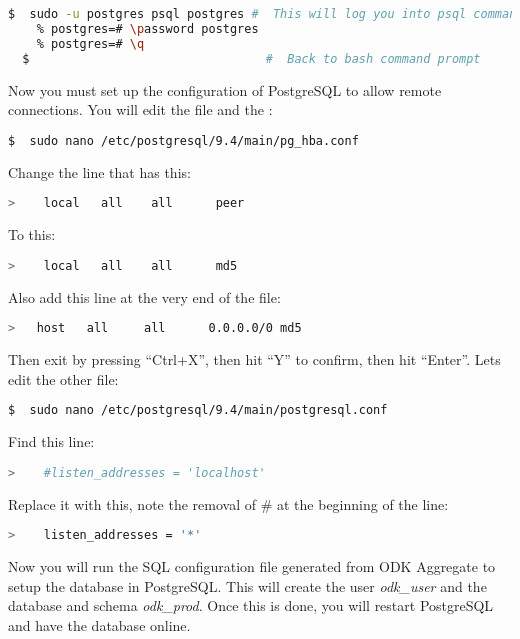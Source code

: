 \begin{lstlisting}[language=bash]
  $  sudo -u postgres psql postgres #  This will log you into psql command prompt.
    % postgres=# \password postgres
    % postgres=# \q
  $                                 #  Back to bash command prompt
\end{lstlisting}

\noindent
Now you must set up the configuration of PostgreSQL to allow remote connections. You will edit the  file and the :

\begin{lstlisting}[language=bash]
  $  sudo nano /etc/postgresql/9.4/main/pg_hba.conf
\end{lstlisting}

\noindent
Change the line that has this:
\begin{lstlisting}[language=bash]
  >    local   all    all      peer
\end{lstlisting}
\noindent
To this:
\begin{lstlisting}[language=bash]
  >    local   all    all      md5
\end{lstlisting}

\noindent
Also add this line at the very end of the file:
\begin{lstlisting}[language=bash]
  >   host   all     all      0.0.0.0/0 md5
\end{lstlisting}

\noindent
Then exit by pressing ``Ctrl+X'', then hit ``Y'' to confirm, then hit ``Enter''. Lets edit the other file:

\begin{lstlisting}[language=bash]
  $  sudo nano /etc/postgresql/9.4/main/postgresql.conf
\end{lstlisting}

\noindent
Find this line:
\begin{lstlisting}[language=bash]
  >    #listen_addresses = 'localhost'
\end{lstlisting}

\noindent
Replace it with this, note the removal of  \# at the beginning of the line:

\begin{lstlisting}[language=bash]
  >    listen_addresses = '*'
\end{lstlisting}


\noindent
Now you will run the SQL configuration file generated from ODK Aggregate to setup the database in PostgreSQL. This will create the user \emph{odk\_user} and the database and schema \emph{odk\_prod}. Once this is done, you will restart PostgreSQL and have the database online.


